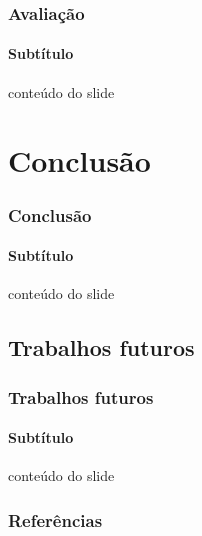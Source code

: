 \documentclass{beamer}
\begin{document}
\begin{frame}
\frametitle{Avaliação}
\framesubtitle{Subtítulo}
 conteúdo do slide
\end{frame}

\section{Conclusão}

\begin{frame}
\frametitle{Conclusão}
\framesubtitle{Subtítulo}
 conteúdo do slide
\end{frame}

\subsection{Trabalhos futuros}

\begin{frame}
\frametitle{Trabalhos futuros}
\framesubtitle{Subtítulo}
 conteúdo do slide\cite{measuringCouplingAndCohesion}
\end{frame}

\begin{frame}
\frametitle{Referências}

{}
\end{frame}
\end{document}
